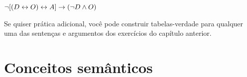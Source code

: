 \begin{compactlist}
%	


\item	$\neg [(D \leftrightarrow O) \leftrightarrow A] \rightarrow (\neg D \wedge O) $

\end{compactlist}


Se quiser prática adicional, você pode construir tabelas-verdade para qualquer uma das sentenças e argumentos dos exercícios do capítulo anterior.
\chapter{Conceitos semânticos}
\label{s:SemanticConcepts}

